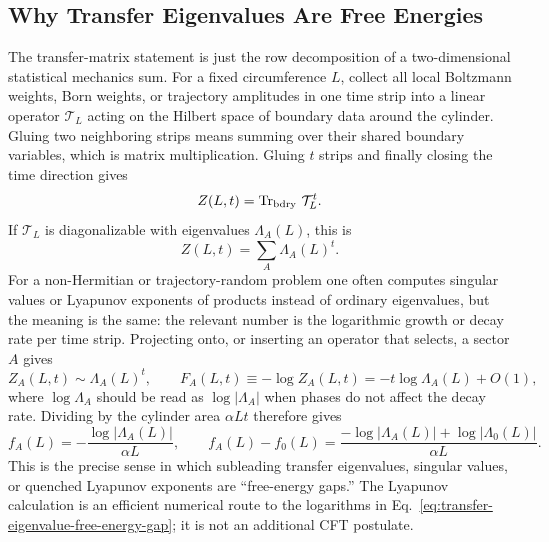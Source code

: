 \documentclass[aps,prb,onecolumn,nofootinbib,superscriptaddress]{revtex4-2}
\newcommand{\Tr}{\operatorname{Tr}}
\newcommand{\cT}{\mathcal{T}}
\theoremstyle{plain}
\theoremstyle{definition}
\begin{document}
\subsection{Why Transfer Eigenvalues Are Free Energies}
\label{sec:transfer-free-energy-identity}

The transfer-matrix statement is just the row decomposition of a two-dimensional
statistical mechanics sum.  For a fixed circumference \(L\), collect all local
Boltzmann weights, Born weights, or trajectory amplitudes in one time strip
into a linear operator \(\cT_L\) acting on the Hilbert space of boundary data
around the cylinder.  Gluing two neighboring strips means summing over their
shared boundary variables, which is matrix multiplication.  Gluing \(t\)
strips and finally closing the time direction gives
\begin{equation}
  Z(L,t)
  =
  \Tr_{\rm bdry}\,\cT_L^t .
  \label{eq:row-transfer-partition-function}
\end{equation}
If \(\cT_L\) is diagonalizable with eigenvalues \(\Lambda_A(L)\), this is
\begin{equation}
  Z(L,t)=\sum_A \Lambda_A(L)^t .
  \label{eq:transfer-eigenvalue-sum}
\end{equation}
For a non-Hermitian or trajectory-random problem one often computes singular
values or Lyapunov exponents of products instead of ordinary eigenvalues, but
the meaning is the same: the relevant number is the logarithmic growth or
decay rate per time strip.  Projecting onto, or inserting an operator that
selects, a sector \(A\) gives
\begin{equation}
  Z_A(L,t)\sim \Lambda_A(L)^t,
  \qquad
  F_A(L,t)\equiv-\log Z_A(L,t)
  =
  -t\log \Lambda_A(L)+O(1),
  \label{eq:sector-transfer-growth}
\end{equation}
where \(\log\Lambda_A\) should be read as \(\log|\Lambda_A|\) when phases do
not affect the decay rate.  Dividing by the cylinder area \(\alpha Lt\)
therefore gives
\begin{equation}
  f_A(L)
  =
  -\frac{\log|\Lambda_A(L)|}{\alpha L},
  \qquad
  f_A(L)-f_0(L)
  =
  \frac{-\log|\Lambda_A(L)|+\log|\Lambda_0(L)|}{\alpha L}.
  \label{eq:transfer-eigenvalue-free-energy-gap}
\end{equation}
This is the precise sense in which subleading transfer eigenvalues, singular
values, or quenched Lyapunov exponents are ``free-energy gaps.''  The
Lyapunov calculation is an efficient numerical route to the logarithms in
Eq.~\eqref{eq:transfer-eigenvalue-free-energy-gap}; it is not an additional
CFT postulate.
\end{document}
